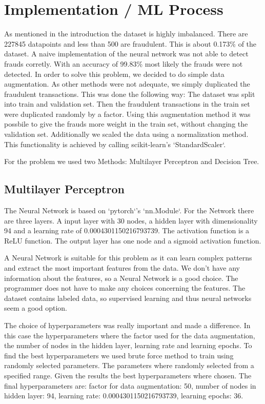\documentclass[a4paper, 10pt, conference]{ieeeconf}      %
\begin{document}
\section{Implementation / ML Process}
\label{sec:methods}
As mentioned in the introduction the dataset is highly imbalanced. There are 227845 datapoints and less than 500 are fraudulent. This is about 0.173\% of the dataset. 
A naive implementation of the neural network was not able to detect frauds corretly. With an accuracy of 99.83\% most likely the frauds were not detected. 
In order to solve this problem, we decided to do simple data augmentation. As other methods were not adequate, we simply duplicated the fraudulent transactions.
This was done the following way: The dataset was split into train and validation set. Then the fraudulent transactions in the train set were duplicated randomly by a factor. 
Using this augmentation method it was possbile to give the frauds more weight in the train set, without changing the validation set. 
Additionally we scaled the data using a normalization method. This functionality is achieved by calling scikit-learn's `StandardScaler`. 

For the problem we used two Methods: Multilayer Perceptron and Decision Tree. 

\subsection{Multilayer Perceptron}

The Neural Network is based on `pytorch`'s `nn.Module`. For the Network there are three layers. 
A input layer with 30 nodes, a hidden layer with dimensionality 94 and a learning rate of 0.0004301150216793739. 
The activation function is a ReLU function. The output layer has one node and a sigmoid activation function. %

A Neural Network is suitable for this problem as it can learn complex patterns and extract the most important features from the data. 
We don't have any information about the features, so a Neural Network is a good choice. The programmer does not have to make any choices concerning the features. 
The dataset contains labeled data, so supervised learning and thus neural networks seem a good option.

The choice of hyperparameters was really important and made a difference. In this case the hyperparameters where the factor used for the data augmentation, the number of nodes in the hidden layer, learning rate and learning epochs. 
To find the best hyperparameters we used brute force method to train using randomly selected parameters. The parameters where randomly selected from a specified range. 
Given the results the best hyperparameters where chosen. 
The final hyperparameters are: factor for data augmentation: 50, number of nodes in hidden layer: 94, learning rate: 0.0004301150216793739, learning epochs: 36.  %
\end{document}
